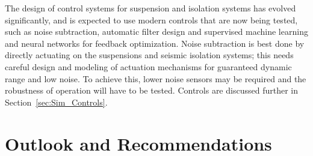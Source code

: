  The design of control systems for suspension and isolation systems has evolved significantly, and is expected to use modern controls that are now being tested, such as noise subtraction, automatic filter design and supervised machine learning and neural networks for feedback optimization. 
Noise subtraction is best done by directly actuating on the suspensions and seismic isolation systems; this needs careful design and modeling of actuation mechanisms for guaranteed dynamic range and low noise.  To achieve this, lower noise sensors may be required and the robustness of operation will have to be tested. Controls are discussed further in Section~\ref{sec:Sim_Controls}.

\section{Outlook and Recommendations}


